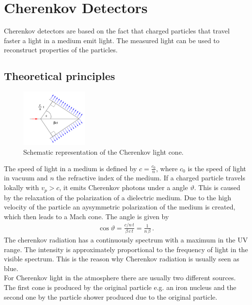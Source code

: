 \section{Cherenkov Detectors \cite{cherenkov}}
Cherenkov detectors are based on the fact that charged particles that travel faster a light in a medium emit light. The measured light can be used to reconstruct properties of the particles.
\subsection{Theoretical principles}
\begin{figure}
    \includegraphics[width=0.3\textwidth]{graphics/Cone.png}
    \caption{Schematic representation of the Cherenkov light cone. \cite{cherenkov}}
  \end{figure}
  \FloatBarrier
The speed of light in a medium is defined by $c = \frac{c_0}{n}$, where $c_0$ is the speed of light in vacuum and $n$ the refractive index of the medium. If a charged particle travels lokally with $v_p > c$, it emits Cherenkov photons under a angle $\vartheta$. This is caused by the relaxation of the polarization of a dielectric medium. Due to the high velocity of the particle an aysymmetric polarization of the medium is created, which then leads to a Mach cone. The angle is given by
\begin{align*}
  \cos \vartheta = \frac{c/n \, t}{\beta\, c\, t} = \frac{1}{n \, \beta} \, .
\end{align*}
The cherenkov radiation has a continuously spectrum with a maximum in the UV range. The intensity is approximately proportional to the frequency of light in the visible spectrum. This is the reason why Cherenkov radiation is usually seen as blue.\\
For Cherenkov light in the atmosphere there are usually two different sources. The first cone is produced by the original particle e.g. an iron nucleus and the second one by the particle shower produced due to the original particle.
